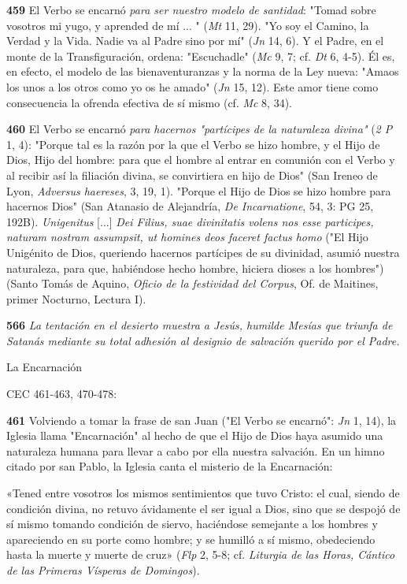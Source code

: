 \documentclass[]{article}
\begin{document}
\textbf{459} El Verbo se encarnó \emph{para ser nuestro modelo de
santidad}: "Tomad sobre vosotros mi yugo, y aprended de mí ... "
(\emph{Mt} 11, 29). "Yo soy el Camino, la Verdad y la Vida. Nadie va al
Padre sino por mí" (\emph{Jn} 14, 6). Y el Padre, en el monte de la
Transfiguración, ordena: "Escuchadle" (\emph{Mc} 9, 7; cf. \emph{Dt} 6,
4-5). Él es, en efecto, el modelo de las bienaventuranzas y la norma de
la Ley nueva: "Amaos los unos a los otros como yo os he amado"
(\emph{Jn} 15, 12). Este amor tiene como consecuencia la ofrenda
efectiva de sí mismo (cf. \emph{Mc} 8, 34).

\textbf{460} El Verbo se encarnó \emph{para hacernos "partícipes de la
naturaleza divina"} (\emph{2 P} 1, 4): "Porque tal es la razón por la
que el Verbo se hizo hombre, y el Hijo de Dios, Hijo del hombre: para
que el hombre al entrar en comunión con el Verbo y al recibir así la
filiación divina, se convirtiera en hijo de Dios" (San Ireneo de Lyon,
\emph{Adversus haereses}, 3, 19, 1). "Porque el Hijo de Dios se hizo
hombre para hacernos Dios" (San Atanasio de Alejandría, \emph{De
Incarnatione}, 54, 3: PG 25, 192B). \emph{Unigenitus} {[}...{]}
\emph{Dei Filius, suae divinitatis volens nos esse participes, naturam
nostram assumpsit, ut homines deos faceret factus homo} ("El Hijo
Unigénito de Dios, queriendo hacernos partícipes de su divinidad, asumió
nuestra naturaleza, para que, habiéndose hecho hombre, hiciera dioses a
los hombres") (Santo Tomás de Aquino, \emph{Oficio de la festividad del
Corpus}, Of. de Maitines, primer Nocturno, Lectura I).

\textbf{566} \emph{La tentación en el desierto muestra a Jesús, humilde
Mesías que triunfa de Satanás mediante su total adhesión al designio de
salvación querido por el Padre.}

La Encarnación

CEC 461-463, 470-478:

\textbf{461} Volviendo a tomar la frase de san Juan ("El Verbo se
encarnó": \emph{Jn} 1, 14), la Iglesia llama "Encarnación" al hecho de
que el Hijo de Dios haya asumido una naturaleza humana para llevar a
cabo por ella nuestra salvación. En un himno citado por san Pablo, la
Iglesia canta el misterio de la Encarnación:

«Tened entre vosotros los mismos sentimientos que tuvo Cristo: el cual,
siendo de condición divina, no retuvo ávidamente el ser igual a Dios,
sino que se despojó de sí mismo tomando condición de siervo, haciéndose
semejante a los hombres y apareciendo en su porte como hombre; y se
humilló a sí mismo, obedeciendo hasta la muerte y muerte de cruz»
(\emph{Flp} 2, 5-8; cf. \emph{Liturgia de las Horas, Cántico de las
Primeras Vísperas de Domingos}).
\end{document}
